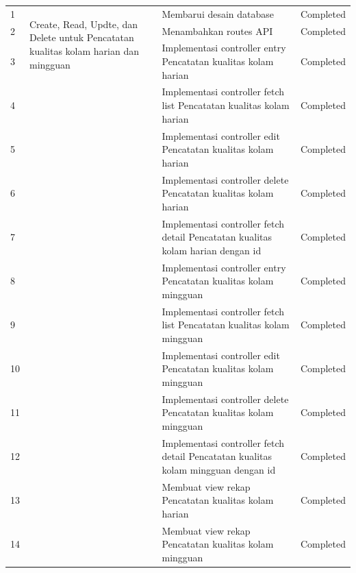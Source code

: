 \begin{longtable}{@{} |p{0.5cm}|p{5cm}|p{5cm}|p{2cm}| @{}}
		1 & \multirow{3}{5cm}{Create, Read, Updte, dan Delete untuk Pencatatan kualitas kolam harian dan mingguan} & Membarui desain database  & Completed\\
		\cline{1-1}\cline{3-4}
		2 & & Menambahkan routes API & Completed\\
		\cline{1-1}\cline{3-4}
		3 & & Implementasi controller entry Pencatatan kualitas kolam harian & Completed\\
		\cline{1-1}\cline{3-4}
		4 & & Implementasi controller fetch list Pencatatan kualitas kolam harian & Completed\\
		\cline{1-1}\cline{3-4}
		5 & & Implementasi controller edit Pencatatan kualitas kolam harian & Completed\\
		\cline{1-1}\cline{3-4}
		6 & & Implementasi controller delete Pencatatan kualitas kolam harian & Completed\\
		\cline{1-1}\cline{3-4}
		7 & & Implementasi controller fetch detail Pencatatan kualitas kolam harian dengan id& Completed\\
		\cline{1-1}\cline{3-4}
        		8 & & Implementasi controller entry Pencatatan kualitas kolam mingguan & Completed\\
		\cline{1-1}\cline{3-4}
		9 & & Implementasi controller fetch list Pencatatan kualitas kolam mingguan & Completed\\
		\cline{1-1}\cline{3-4}
		10 & & Implementasi controller edit Pencatatan kualitas kolam mingguan & Completed\\
		\cline{1-1}\cline{3-4}
		11 & & Implementasi controller delete Pencatatan kualitas kolam mingguan & Completed\\
		\cline{1-1}\cline{3-4}
		12 & & Implementasi controller fetch detail Pencatatan kualitas kolam mingguan dengan id& Completed\\
		\cline{1-1}\cline{3-4}
		13 & & Membuat view rekap Pencatatan kualitas kolam harian & Completed\\
		\cline{1-1}\cline{3-4}
		14 & & Membuat view rekap Pencatatan kualitas kolam mingguan & Completed\\
		\cline{1-1}\cline{3-4}
		\hline

\end{longtable}

